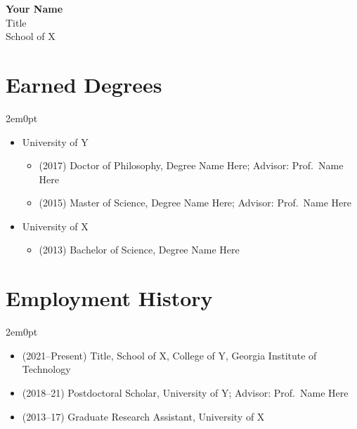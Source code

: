 \documentclass[11pt]{article}
\renewcommand{\myname}{Your Name}
\renewcommand{\mytitle}{Title}
\renewcommand{\myschool}{School of X}
\renewcommand{\mycollege}{College of Y}
\begin{document}
\thispagestyle{empty}
\tableofcontents
{}
\newpage

\setcounter{page}{1}
\begin{center}
    {\Large \bf \myname}  \smallskip \\
    {\large \mytitle} \\
    {\large \myschool}
\end{center}

\section{Earned Degrees}
\begin{adjustwidth}{2em}{0pt}

\begin{itemize}
    \item University of Y
    \begin{itemize}
        \item[] (2017) Doctor of Philosophy, Degree Name Here; Advisor: Prof.\ Name Here
        \item[] (2015) Master of Science, Degree Name Here; Advisor: Prof.\ Name Here
    \end{itemize}
    \item University of X
    \begin{itemize}
        \item[] (2013) Bachelor of Science, Degree Name Here
    \end{itemize}
\end{itemize}

\end{adjustwidth}

\section{Employment History}
\begin{adjustwidth}{2em}{0pt}

\begin{itemize}
    \item (2021--Present) \mytitle, \myschool, \mycollege, Georgia Institute of Technology
    \item (2018--21) Postdoctoral Scholar, University of Y; Advisor: Prof.\ Name Here
    \item (2013--17) Graduate Research Assistant, University of X 
\end{itemize}

\end{adjustwidth}
\end{document}
